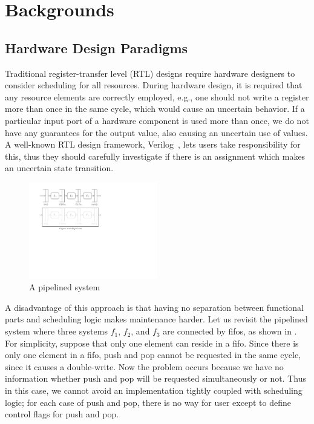 \chapter{Backgrounds}
\label{chap:backgrounds}

\section{Hardware Design Paradigms}
\label{sec:design-paradigm}

Traditional register-transfer level (RTL) designs require hardware
designers to consider scheduling for all resources. During hardware
design, it is required that any resource elements are correctly
employed, e.g., one should not write a register more than once in the
same cycle, which would cause an uncertain behavior. If a particular
input port of a hardware component is used more than once, we do not
have any guarantees for the output value, also causing an uncertain
use of values. A well-known RTL design framework,
Verilog~\cite{verilog}, lets users take responsibility for this, thus
they should carefully investigate if there is an assignment which
makes an uncertain state transition.
\begin{figure}[h]
  \centering
  \includegraphics[width=0.5\textwidth]{figures/pipeline.pdf}
  \caption{A pipelined system}
  \label{fig-pipelined-system}
\end{figure}

A disadvantage of this approach is that having no separation between
functional parts and scheduling logic makes maintenance harder. Let us
revisit the pipelined system where three systems $f_1$, $f_2$, and
$f_3$ are connected by fifos, as shown in
. For simplicity, suppose that only one
element can reside in a fifo. Since there is only one element in a
fifo, push and pop cannot be requested in the same cycle, since it
causes a double-write. Now the problem occurs because we have no
information whether push and pop will be requested simultaneously or
not. Thus in this case, we cannot avoid an implementation tightly
coupled with scheduling logic; for each case of push and pop, there is
no way for user except to define control flags for push and pop.

